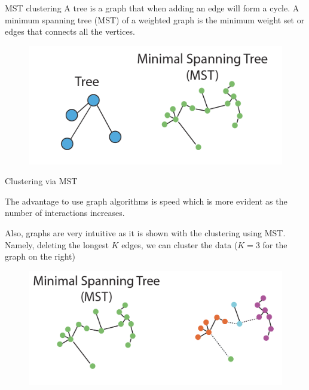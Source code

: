 \documentclass{beamer}
\begin{document}
\begin{frame}{MST clustering}
	A tree is a graph that when adding an edge will form a cycle.
	A minimum spanning tree (MST) of a weighted graph is the minimum weight set or edges that connects all the vertices. 
	
			\begin{figure}[h]
		\centering
		\includegraphics[scale=0.45]{../../Figures/tree_mst.png}
	\end{figure}	
\end{frame}	

\begin{frame}{Clustering via MST}
	
	The advantage to use graph algorithms is speed which is more evident as the number of interactions increases. 
	
	Also, graphs are very intuitive as it is shown with the clustering using MST. Namely, deleting the longest $K$ edges, we can cluster the data ($K=3$ for the graph on the right) 
	
				\begin{figure}[h]
		\centering
		\includegraphics[scale=0.45]{../../Figures/mst_clustering.png}
	\end{figure}	
	
	
	
\end{frame}
\end{document}
